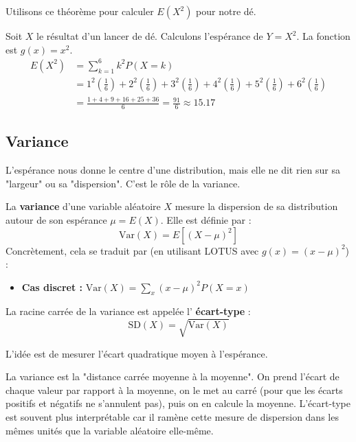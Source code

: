 Utilisons ce théorème pour calculer $E(X^2)$ pour notre dé.

\begin{examplebox}
Soit $X$ le résultat d'un lancer de dé. Calculons l'espérance de $Y=X^2$. La fonction est $g(x)=x^2$.
\begin{align*}
E(X^2) &= \sum_{k=1}^6 k^2 P(X=k) \\
&= 1^2\left(\frac{1}{6}\right) + 2^2\left(\frac{1}{6}\right) + 3^2\left(\frac{1}{6}\right) + 4^2\left(\frac{1}{6}\right) + 5^2\left(\frac{1}{6}\right) + 6^2\left(\frac{1}{6}\right) \\
&= \frac{1+4+9+16+25+36}{6} = \frac{91}{6} \approx 15.17
\end{align*}
\end{examplebox}

\subsection{Variance}

L'espérance nous donne le centre d'une distribution, mais elle ne dit rien sur sa "largeur" ou sa "dispersion". C'est le rôle de la variance.

\begin{definitionbox}
La \textbf{variance} d'une variable aléatoire $X$ mesure la dispersion de sa distribution autour de son espérance $\mu = E(X)$. Elle est définie par :
$$\text{Var}(X) = E\left[ (X - \mu)^2 \right]$$
Concrètement, cela se traduit par (en utilisant LOTUS avec $g(x)=(x-\mu)^2$) :
\begin{itemize}
    \item \textbf{Cas discret :} $\text{Var}(X) = \sum_x (x - \mu)^2 P(X=x)$
\end{itemize}
La racine carrée de la variance est appelée l' \textbf{écart-type} :
$$\text{SD}(X) = \sqrt{\text{Var}(X)}$$
\end{definitionbox}

L'idée est de mesurer l'écart quadratique moyen à l'espérance.

\begin{intuitionbox}
La variance est la "distance carrée moyenne à la moyenne". On prend l'écart de chaque valeur par rapport à la moyenne, on le met au carré (pour que les écarts positifs et négatifs ne s'annulent pas), puis on en calcule la moyenne. L'écart-type est souvent plus interprétable car il ramène cette mesure de dispersion dans les mêmes unités que la variable aléatoire elle-même.
\end{intuitionbox}

